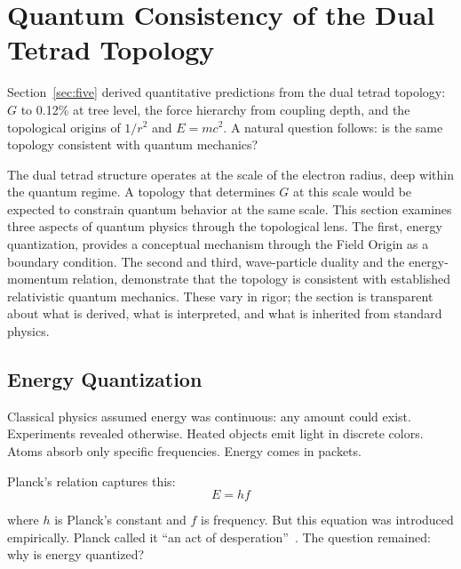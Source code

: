 \documentclass[aps,prd,preprint,superscriptaddress,showpacs,preprintnumbers,amsmath,amssymb,nofootinbib]{revtex4-2}
\begin{document}
\section{Quantum Consistency of the Dual Tetrad Topology}
\label{sec:four-more}

Section~\ref{sec:five} derived quantitative predictions from the dual tetrad topology: $G$ to 0.12\% at tree level, the force hierarchy from coupling depth, and the topological origins of $1/r^2$ and $E = mc^2$. A natural question follows: is the same topology consistent with quantum mechanics?

The dual tetrad structure operates at the scale of the electron radius, deep within the quantum regime. A topology that determines $G$ at this scale would be expected to constrain quantum behavior at the same scale. This section examines three aspects of quantum physics through the topological lens. The first, energy quantization, provides a conceptual mechanism through the Field Origin as a boundary condition. The second and third, wave-particle duality and the energy-momentum relation, demonstrate that the topology is consistent with established relativistic quantum mechanics. These vary in rigor; the section is transparent about what is derived, what is interpreted, and what is inherited from standard physics.

\subsection{Energy Quantization}
\label{subsec:quantization}

Classical physics assumed energy was continuous: any amount could exist. Experiments revealed otherwise. Heated objects emit light in discrete colors. Atoms absorb only specific frequencies. Energy comes in packets.

Planck's relation captures this:
\begin{equation}
E = hf
\end{equation}

where $h$ is Planck's constant and $f$ is frequency. But this equation was introduced empirically. Planck called it ``an act of desperation''~\cite{planck1931}. The question remained: why is energy quantized?
\end{document}
